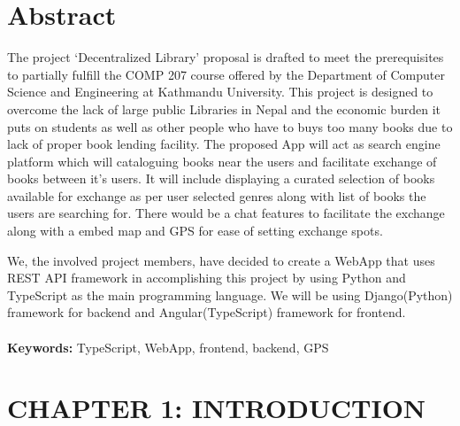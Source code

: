 \documentclass[12pt]{article}
\begin{document}
\section*{Abstract}
The project ‘Decentralized Library’ proposal is drafted to meet the prerequisites to partially fulfill the COMP 207 course offered by the Department of Computer Science and Engineering at Kathmandu University. This project is designed to overcome the lack of large public Libraries in Nepal and the economic burden it puts on students as well as other people who have to buys too many books due to lack of proper book lending facility. The proposed App will act as search engine platform which will cataloguing books near the users and facilitate exchange of books between it’s users. It will include displaying a curated selection of books available for exchange as per user selected genres along with list of books the users are searching for. There would be a chat features to facilitate the exchange along with a embed map and GPS for ease of setting exchange spots. 

We, the involved project members, have decided to create a WebApp that uses REST API framework in accomplishing this project by using Python and TypeScript as the main programming language. We will be using Django(Python) framework for backend and Angular(TypeScript) framework for frontend.
\\\\
\textbf{Keywords:} TypeScript, WebApp, frontend, backend, GPS

\clearpage
\thispagestyle{empty}
\tableofcontents

\clearpage
\thispagestyle{empty}
\listoffigures

\clearpage
{}
\section{CHAPTER 1: INTRODUCTION}
\end{document}
